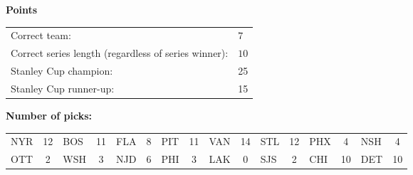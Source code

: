 \documentclass[10pt]{article}
\begin{document}
{\bf Points}\\
\begin{minipage}[t]{12cm}
    \vspace{0pt}
    \begin{tabular}{l l}
        Correct team:	& $7$\\
        Correct series length (regardless of series winner):	& $10$\\
        Stanley Cup champion:	& 25\\
        Stanley Cup runner-up:	& 15\\
    \end{tabular}

    \vspace{0.5cm}
    {\bf Number of picks:}\\
    \begin{tabular}{lc | lc | lc | lc | lc | lc | lc | lc }
        NYR & 12 & BOS & 11 & FLA & 8 & PIT & 11 & VAN & 14 & STL & 12 & PHX & 4 & NSH & 4 \\
        OTT & 2 & WSH & 3 & NJD & 6 & PHI & 3 & LAK & 0 & SJS & 2 & CHI & 10 & DET & 10 \\
    \end{tabular}
\end{minipage}
%
\end{document}
